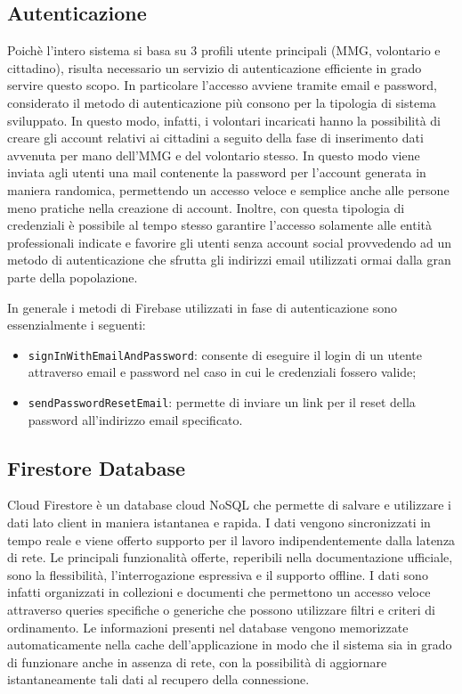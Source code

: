 \documentclass[12pt,a4paper,twoside,openright,titlepage]{book}
\begin{document}
\subsection{Autenticazione}
Poichè l'intero sistema si basa su 3 profili utente principali (MMG, volontario e cittadino), risulta necessario un servizio di autenticazione efficiente in grado servire questo scopo. In particolare l'accesso avviene tramite email e password, considerato il metodo di autenticazione più consono per la tipologia di sistema sviluppato. In questo modo, infatti, i volontari incaricati hanno la possibilità di creare gli account relativi ai cittadini a seguito della fase di inserimento dati avvenuta per mano dell'MMG e del volontario stesso. In questo modo viene inviata agli utenti una mail contenente la password per l'account generata in maniera randomica, permettendo un accesso veloce e semplice anche alle persone meno pratiche nella creazione di account. Inoltre, con questa tipologia di credenziali è possibile al tempo stesso garantire l'accesso solamente alle entità professionali indicate e favorire gli utenti senza account social provvedendo ad un metodo di autenticazione che sfrutta gli indirizzi email utilizzati ormai dalla gran parte della popolazione.\newline

In generale i metodi di Firebase utilizzati in fase di autenticazione sono essenzialmente i seguenti:
\begin{itemize}
\item \texttt{signInWithEmailAndPassword}: consente di eseguire il login di un utente attraverso email e password nel caso in cui le credenziali fossero valide;
\item \texttt{sendPasswordResetEmail}: permette di inviare un link per il reset della password all'indirizzo email specificato.
\end{itemize}

\subsection{Firestore Database}
Cloud Firestore è un database cloud NoSQL che permette di salvare e utilizzare i dati lato client in maniera istantanea e rapida. I dati vengono sincronizzati in tempo reale e viene offerto supporto per il lavoro indipendentemente dalla latenza di rete. Le principali funzionalità offerte, reperibili nella documentazione ufficiale, sono la flessibilità, l'interrogazione espressiva e il supporto offline. I dati sono infatti organizzati in collezioni e documenti che permettono un accesso veloce attraverso queries specifiche o generiche che possono utilizzare filtri e criteri di ordinamento. Le informazioni presenti nel database vengono memorizzate automaticamente nella cache dell'applicazione in modo che il sistema sia in grado di funzionare anche in assenza di rete, con la possibilità di aggiornare istantaneamente tali dati al recupero della connessione.\newline
\end{document}
